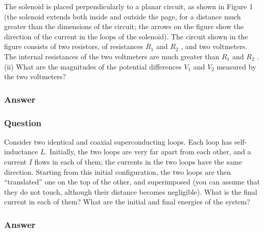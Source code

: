 The solenoid is placed perpendicularly to a planar circuit, as shown in Figure 1 (the solenoid extends both inside and outside the page, for a distance much greater than the dimensions of the circuit; the arrows on the figure show the direction of the current in the loops of the solenoid). The circuit shown in the figure consists of two resistors, of resistances $R_1$ and $R_2$ , and two voltmeters. The internal resistances of the two voltmeters are much greater than $R_1$ and $R_2$ . (ii) What are the magnitudes of the potential differences $V_1$ and $V_2$ measured by the two voltmeters?

\subsubsection{Answer}


\subsubsection{Question}
Consider two identical and coaxial superconducting loops. Each loop has self-inductance $L$. Initially, the two loops are very far apart from each other, and a current $I$ flows in each of them; the currents in the two loops have the same direction. Starting from this initial configuration, the two loops are then ``translated'' one on the top of the other, and superimposed (you can assume that they do not touch, although their distance becomes negligible). What is the final current in each of them? What are the initial and final energies of the system?

\subsubsection{Answer}



